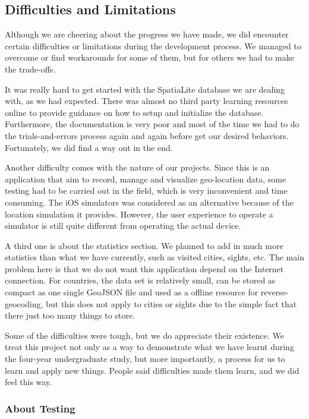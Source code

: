 \documentclass[12pt,a4paper]{article}
\begin{document}
        \subsection{Difficulties and Limitations} %
            \label{conclusion:difficulty}
            Although we are cheering about the progress we have made, we did encounter certain difficulties or limitations during the development process. We managed to overcome or find workarounds for some of them, but for others we had to make the trade-offs. 
            
            It was really hard to get started with the SpatiaLite database we are dealing with, as we had expected. There was almost no third party learning resources online to provide guidance on how to setup and initialize the database. Furthermore, the documentation is very poor and most of the time we had to do the trials-and-errors process again and again before get our desired behaviors. Fortunately, we did find a way out in the end.
            
            Another difficulty comes with the nature of our projects. Since this is an application that aim to record, manage and visualize geo-location data, some testing had to be carried out in the field, which is very inconvenient and time consuming. The iOS simulators was considered as an alternative because of the location simulation it provides. However, the user experience to operate a simulator is still quite different from operating the actual device.
            
            A third one is about the statistics section. We planned to add in much more statistics than what we have currently, such as visited cities, sights, etc. The main problem here is that we do not want this application depend on the Internet connection. For countries, the data set is relatively small, can be stored as compact as one single GeoJSON file and used as a offline resource for reverse- geocoding, but this does not apply to cities or sights due to the simple fact that there just too many things to store.
            
            Some of the difficulties were tough, but we do appreciate their existence. We treat this project not only as a way to demonstrate what we have learnt during the four-year undergraduate study, but more importantly, a process for us to learn and apply new things. People said difficulties made them learn, and we did feel this way.
            
            \subsubsection*{About Testing}
            
\end{document}
